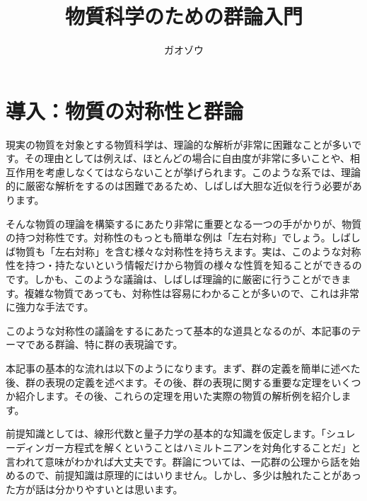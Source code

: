 \documentclass[uplatex,dvipdfmx]{jsarticle}
\title{物質科学のための群論入門}
\author{ガオゾウ}
\begin{document}
\maketitle
\section{導入：物質の対称性と群論}
現実の物質を対象とする物質科学は、理論的な解析が非常に困難なことが多いです。その理由としては例えば、ほとんどの場合に自由度が非常に多いことや、相互作用を考慮しなくてはならないことが挙げられます。このような系では、理論的に厳密な解析をするのは困難であるため、しばしば大胆な近似を行う必要があります。

そんな物質の理論を構築するにあたり非常に重要となる一つの手がかりが、物質の持つ対称性です。対称性のもっとも簡単な例は「左右対称」でしょう。しばしば物質も「左右対称」を含む様々な対称性を持ちえます。実は、このような対称性を持つ・持たないという情報だけから物質の様々な性質を知ることができるのです。しかも、このような議論は、しばしば理論的に厳密に行うことができます。複雑な物質であっても、対称性は容易にわかることが多いので、これは非常に強力な手法です。



このような対称性の議論をするにあたって基本的な道具となるのが、本記事のテーマである群論、特に群の表現論です。

本記事の基本的な流れは以下のようになります。まず、群の定義を簡単に述べた後、群の表現の定義を述べます。その後、群の表現に関する重要な定理をいくつか紹介します。その後、これらの定理を用いた実際の物質の解析例を紹介します。

前提知識としては、線形代数と量子力学の基本的な知識を仮定します。「シュレーディンガー方程式を解くということはハミルトニアンを対角化することだ」と言われて意味がわかれば大丈夫です。群論については、一応群の公理から話を始めるので、前提知識は原理的にはいりません。しかし、多少は触れたことがあった方が話は分かりやすいとは思います。
\end{document}
